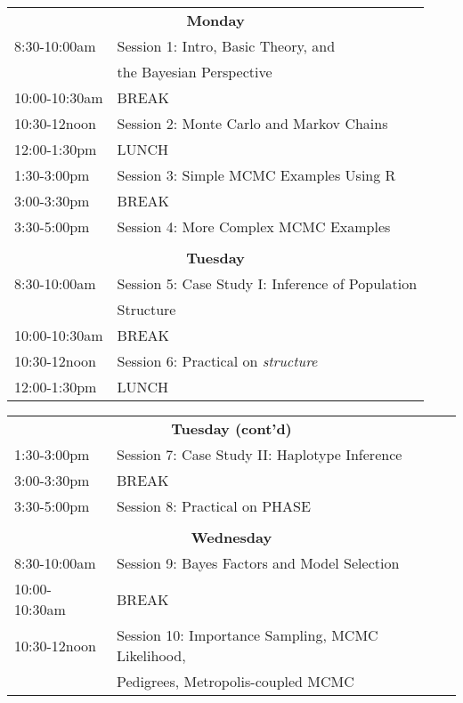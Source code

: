 \begin{tabular}{ll}
\multicolumn{2}{c}{\bf Monday}\\
8:30-10:00am   &Session 1: Intro, Basic Theory, and\\
                          &the Bayesian Perspective \\
10:00-10:30am  &BREAK\\
10:30-12noon   &Session 2: Monte Carlo and Markov Chains\\
12:00-1:30pm   &LUNCH\\
1:30-3:00pm      &Session 3: Simple MCMC Examples Using R\\
3:00-3:30pm    &BREAK\\
3:30-5:00pm    &Session 4: More Complex MCMC Examples\\
& \\
\multicolumn{2}{c}{\bf Tuesday}\\

8:30-10:00am   &Session 5: Case Study I: Inference of Population \\
				&Structure\\
10:00-10:30am  &BREAK\\
10:30-12noon   &Session 6: Practical on {\em structure}\\
12:00-1:30pm   &LUNCH\\
\end{tabular}



\es\bs
\begin{tabular}{ll}
\multicolumn{2}{c}{\bf Tuesday (cont'd)}\\
1:30-3:00pm      &Session 7: Case Study II: Haplotype Inference\\
3:00-3:30pm    &BREAK\\
3:30-5:00pm    &Session 8: Practical on PHASE\\
&\\
\multicolumn{2}{c}{\bf Wednesday}\\
8:30-10:00am &Session 9: Bayes Factors and Model Selection\\
10:00-10:30am  &BREAK\\
10:30-12noon   &Session 10: Importance Sampling, MCMC Likelihood, \\ & Pedigrees, 
				Metropolis-coupled MCMC\\
\end{tabular}

